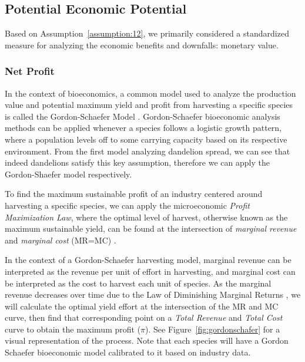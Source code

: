 \subsection{Potential Economic Potential}

Based on Assumption~\ref{assumption:12}, we primarily considered a standardized measure for analyzing the economic benefits and downfalls: monetary value. 

\subsubsection{Net Profit}

In the context of bioeconomics, a common model used to analyze the production value and potential maximum yield and profit from harvesting a specific species is called the Gordon-Schaefer Model \cite{wikipediaGordonSchaeferModel}. Gordon-Schaefer bioeconomic analysis methods can be applied whenever a species follows a logistic growth pattern, where a population levels off to some carrying capacity based on its respective environment. From the first model analyzing dandelion spread, we can see that indeed dandelions satisfy this key assumption, therefore we can apply the Gordon-Shaefer model respectively.

To find the maximum sustainable profit of an industry centered around harvesting a specific species, we can apply the microeconomic \textit{Profit Maximization Law}, where the optimal level of harvest, otherwise known as the maximum sustainable yield, can be found at the intersection of \textit{marginal revenue} and \textit{marginal cost} (MR=MC) \cite{intelligenteconomistProfitMaximization}.

In the context of a Gordon-Schaefer harvesting model, marginal revenue can be interpreted as the revenue per unit of effort in harvesting, and marginal cost can be interpreted as the cost to harvest each unit of species. As the marginal revenue decreases over time due to the Law of Diminishing Marginal Returns \cite{investopediaDiminishingMarginal}, we will calculate the optimal yield effort at the intersection of the MR and MC curve, then find that corresponding point on a \textit{Total Revenue} and \textit{Total Cost} curve to obtain the maximum profit (\(\pi\)). See Figure~\ref{fig:gordonschafer} for a visual representation of the process. Note that each species will have a Gordon Schaefer bioeconomic model calibrated to it based on industry data.


